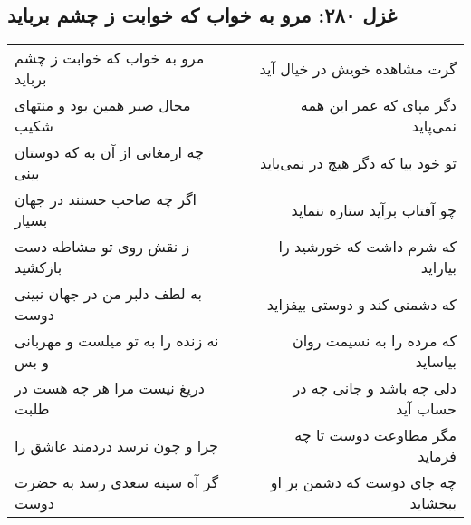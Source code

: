 \begin{center}
\section*{غزل ۲۸۰: مرو به خواب که خوابت ز چشم برباید}
\label{sec:280}
\begin{longtable}{l p{0.5cm} r}
مرو به خواب که خوابت ز چشم برباید
&&
گرت مشاهده خویش در خیال آید
\\
مجال صبر همین بود و منتهای شکیب
&&
دگر مپای که عمر این همه نمی‌پاید
\\
چه ارمغانی از آن به که دوستان بینی
&&
تو خود بیا که دگر هیچ در نمی‌باید
\\
اگر چه صاحب حسنند در جهان بسیار
&&
چو آفتاب برآید ستاره ننماید
\\
ز نقش روی تو مشاطه دست بازکشید
&&
که شرم داشت که خورشید را بیاراید
\\
به لطف دلبر من در جهان نبینی دوست
&&
که دشمنی کند و دوستی بیفزاید
\\
نه زنده را به تو میلست و مهربانی و بس
&&
که مرده را به نسیمت روان بیاساید
\\
دریغ نیست مرا هر چه هست در طلبت
&&
دلی چه باشد و جانی چه در حساب آید
\\
چرا و چون نرسد دردمند عاشق را
&&
مگر مطاوعت دوست تا چه فرماید
\\
گر آه سینه سعدی رسد به حضرت دوست
&&
چه جای دوست که دشمن بر او ببخشاید
\\
\end{longtable}
\end{center}
